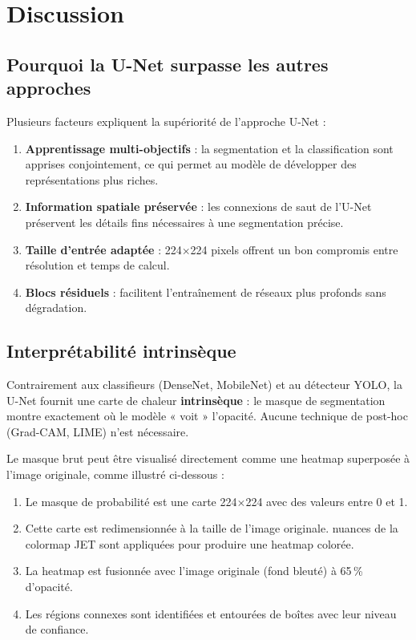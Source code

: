 \documentclass[12pt,a4paper,twoside]{report}
\begin{document}
\section{Discussion}

\subsection{Pourquoi la U-Net surpasse les autres approches}

Plusieurs facteurs expliquent la supériorité de l'approche U-Net :

\begin{enumerate}
  \item \textbf{Apprentissage multi-objectifs} : la segmentation et la classification sont apprises conjointement, ce qui permet au modèle de développer des représentations plus riches.
  \item \textbf{Information spatiale préservée} : les connexions de saut de l'U-Net préservent les détails fins nécessaires à une segmentation précise.
  \item \textbf{Taille d'entrée adaptée} : 224$\times$224 pixels offrent un bon compromis entre résolution et temps de calcul.
  \item \textbf{Blocs résiduels} : facilitent l'entraînement de réseaux plus profonds sans dégradation.
\end{enumerate}

\subsection{Interprétabilité intrinsèque}

Contrairement aux classifieurs (DenseNet, MobileNet) et au détecteur YOLO, la U-Net fournit une carte de chaleur \textbf{intrinsèque} : le masque de segmentation montre exactement où le modèle « voit » l'opacité. Aucune technique de post-hoc (Grad-CAM, LIME) n'est nécessaire.

Le masque brut peut être visualisé directement comme une heatmap superposée à l'image originale, comme illustré ci-dessous :

\begin{enumerate}
  \item Le masque de probabilité est une carte 224$\times$224 avec des valeurs entre 0 et 1.
  \item Cette carte est redimensionnée à la taille de l'image originale.
   nuances de la colormap JET sont appliquées pour produire une heatmap colorée.
  \item La heatmap est fusionnée avec l'image originale (fond bleuté) à 65\,\% d'opacité.
  \item Les régions connexes sont identifiées et entourées de boîtes avec leur niveau de confiance.
\end{enumerate}
\end{document}
